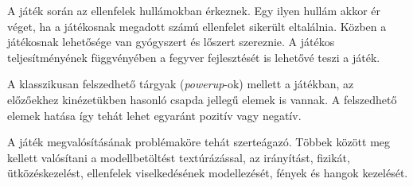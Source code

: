 A játék során az ellenfelek hullámokban érkeznek. Egy ilyen hullám akkor ér véget, ha a játékosnak megadott számú ellenfelet sikerült eltalálnia. Közben a játékosnak lehetősége van gyógyszert és lőszert szereznie. A játékos teljesítményének függvényében a fegyver fejlesztését is lehetővé teszi a játék.

A klasszikusan felszedhető tárgyak (\textit{powerup}-ok) mellett a játékban, az előzőekhez kinézetükben hasonló csapda jellegű elemek is vannak. A felszedhető elemek hatása így tehát lehet egyaránt pozitív vagy negatív.

A játék megvalósításának problémaköre tehát szerteágazó. Többek között meg kellett valósítani a modellbetöltést textúrázással, az irányítást, fizikát, ütközéskezelést, ellenfelek viselkedésének modellezését, fények és hangok kezelését.

